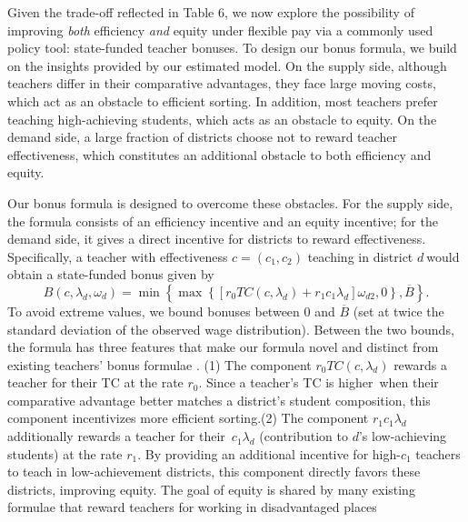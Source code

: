 \documentclass[notitlepage,12pt]{article}%
\begin{document}
Given the trade-off reflected in Table 6, we now explore the possibility of
improving \emph{both} efficiency \emph{and} equity under flexible pay via a
commonly used policy tool: state-funded teacher bonuses. To design our bonus
formula, we build on the insights provided by our estimated model. On the
supply side, although teachers differ in their comparative advantages, they
face large moving costs, which act as an obstacle to efficient sorting. In
addition, most teachers prefer teaching high-achieving students, which acts as
an obstacle to equity. On the demand side, a large fraction of districts
choose not to reward teacher effectiveness, which constitutes an additional
obstacle to both efficiency and equity.

Our bonus formula is designed to overcome these obstacles. For the supply
side, the formula consists of an efficiency incentive and an equity incentive;
for the demand side, it gives a direct incentive for districts to reward
effectiveness. Specifically, a teacher with effectiveness $c=\left(
c_{1},c_{2}\right)  $ teaching in district $d\ $would obtain a state-funded
bonus given by
\begin{equation}
B\left(  c,\lambda_{d},\omega_{d}\right)  =\min\left\{  \max\left\{  \left[
r_{0}TC\left(  c,\lambda_{d}\right)  +r_{1}c_{1}\lambda_{d}\right]
\omega_{d2},0\right\}  ,\overline{B}\right\}  . \tag{B}%
\end{equation}
To avoid extreme values, we bound bonuses between $0$ and $\overline{B}$ (set
at twice the standard deviation of the observed wage distribution). Between
the two bounds, the formula has three features that make our formula novel and
distinct from existing teachers' bonus formulae
\citep[see][for reviews]{neal2011design,pham2021teacher}. \newline(1) The
component $r_{0}TC\left(  c,\lambda_{d}\right)  $ rewards a teacher for their
TC at the rate $r_{0}$. Since a teacher's TC is higher\ when their comparative
advantage better matches a district's student composition, this component
incentivizes more efficient sorting.\newline(2) The component $r_{1}%
c_{1}\lambda_{d}$ additionally rewards a teacher for their\ $c_{1}\lambda_{d}$
(contribution to $d$'s low-achieving students) at the rate $r_{1}$. By
providing an additional incentive for high-$c_{1}$ teachers to teach in
low-achievement districts, this component directly favors these districts,
improving equity. The goal of equity is shared by many existing formulae that
reward teachers for working in disadvantaged places
\end{document}
